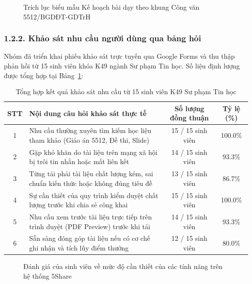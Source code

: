 \begin{figure}[htbp]
\centering
{}
\caption{Trích lục biểu mẫu Kế hoạch bài dạy theo khung Công văn 5512/BGDĐT-GDTrH}
\label{fig:cv5512}
\end{figure}

\subsubsection{1.2.2. Khảo sát nhu cầu người dùng qua bảng hỏi}
Nhóm đã triển khai phiếu khảo sát trực tuyến qua Google Forms và thu thập phản hồi từ 15 sinh viên khóa K49 ngành Sư phạm Tin học. Số liệu định lượng được tổng hợp tại Bảng~\ref{tab:survey}:

\begin{table}[htbp]
\centering
\small
\caption{Tổng hợp kết quả khảo sát nhu cầu từ 15 sinh viên K49 Sư phạm Tin học}
\label{tab:survey}
\begin{tabularx}{\textwidth}{|c|X|c|c|}
\hline
\textbf{STT} & \textbf{Nội dung câu hỏi khảo sát thực tế} & \textbf{Số lượng đồng thuận} & \textbf{Tỷ lệ (\%)} \\
\hline
1 & Nhu cầu thường xuyên tìm kiếm học liệu tham khảo (Giáo án 5512, Đề thi, Slide) & 15 / 15 sinh viên & 100.0\% \\
\hline
2 & Gặp khó khăn do tài liệu trên mạng xã hội bị trôi tin nhắn hoặc mất liên kết & 14 / 15 sinh viên & 93.3\% \\
\hline
3 & Từng tải phải tài liệu chất lượng kém, sai chuẩn kiến thức hoặc không đúng tiêu đề & 13 / 15 sinh viên & 86.7\% \\
\hline
4 & Sự cần thiết của quy trình kiểm duyệt chất lượng trước khi chia sẻ công khai & 15 / 15 sinh viên & 100.0\% \\
\hline
5 & Nhu cầu xem trước tài liệu trực tiếp trên trình duyệt (PDF Preview) trước khi tải & 14 / 15 sinh viên & 93.3\% \\
\hline
6 & Sẵn sàng đóng góp tài liệu nếu có cơ chế ghi nhận và tích lũy điểm thưởng & 12 / 15 sinh viên & 80.0\% \\
\hline
\end{tabularx}
\end{table}

\begin{figure}[htbp]
\centering
\caption{Đánh giá của sinh viên về mức độ cần thiết của các tính năng trên hệ thống 5Share}
\label{fig:survey_features}
\end{figure}

